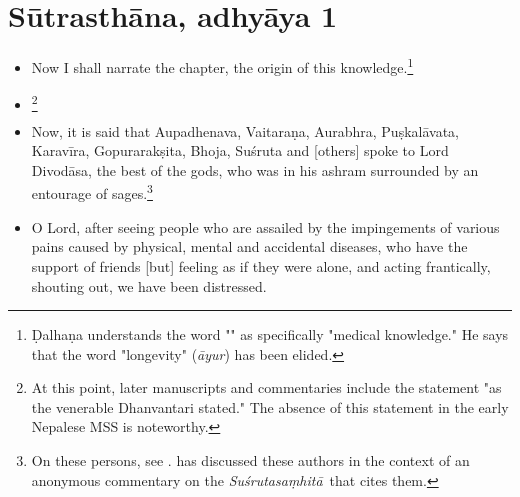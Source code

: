 \documentclass[12pt]{article}
\renewcommand{\SS}{\emph{Suśrutasaṃhitā}}
\begin{document}
    \section{Sūtrasthāna, adhyāya 1}
\begin{itemize}
    \item [1.1]
    Now I shall narrate the chapter, the origin of this knowledge.\footnote{Ḍalhaṇa 
    understands the word "" as specifically "medical knowledge."  
    He says that the word "longevity" (\emph{āyur}) 
     has been elided.}
    
%    
    
    \item[1.2]\footnote{At this point, later manuscripts and commentaries include the 
    statement "as the venerable Dhanvantari stated."  The absence of this statement in the 
    early Nepalese MSS is noteworthy.}
    
    \item[1.3] Now, it is said that Aupadhenava, Vaitaraṇa, Aurabhra, Puṣkalāvata,
Karavīra, Gopurarakṣita, Bhoja, Suśruta and [others] spoke to Lord Divodāsa,
the best of the gods, who was in his ashram surrounded by an entourage of
sages.\footnote{On these persons, see \cite[IA 369\,ff.]{meul-hist}. 
\citet{kleb-2021} has discussed these authors in the context of an anonymous commentary 
on the \SS\ that cites them.}
    
    
    \item[1.4]
O Lord, after seeing people who are assailed by the impingements of various pains caused by 
physical, mental and accidental diseases, who have the support of friends [but] feeling as if they 
were alone, and acting frantically, shouting out, we have been distressed. 
    

\end{itemize}
\end{document}
